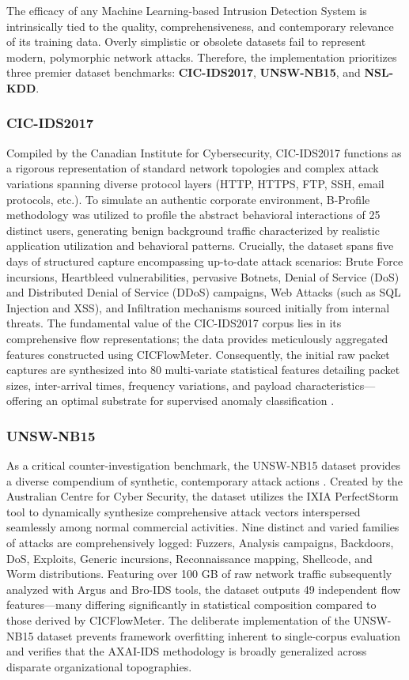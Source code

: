 \documentclass[conference]{IEEEtran}
\begin{document}
The efficacy of any Machine Learning-based Intrusion Detection System is intrinsically tied to the quality, comprehensiveness, and contemporary relevance of its training data. Overly simplistic or obsolete datasets fail to represent modern, polymorphic network attacks. Therefore, the implementation prioritizes three premier dataset benchmarks: \textbf{CIC-IDS2017}, \textbf{UNSW-NB15}, and \textbf{NSL-KDD}.

\subsubsection{CIC-IDS2017}
Compiled by the Canadian Institute for Cybersecurity, CIC-IDS2017 \cite{moustafa2015unsw} functions as a rigorous representation of standard network topologies and complex attack variations spanning diverse protocol layers (HTTP, HTTPS, FTP, SSH, email protocols, etc.). To simulate an authentic corporate environment, B-Profile methodology was utilized to profile the abstract behavioral interactions of 25 distinct users, generating benign background traffic characterized by realistic application utilization and behavioral patterns.
Crucially, the dataset spans five days of structured capture encompassing up-to-date attack scenarios: Brute Force incursions, Heartbleed vulnerabilities, pervasive Botnets, Denial of Service (DoS) and Distributed Denial of Service (DDoS) campaigns, Web Attacks (such as SQL Injection and XSS), and Infiltration mechanisms sourced initially from internal threats. The fundamental value of the CIC-IDS2017 corpus lies in its comprehensive flow representations; the data provides meticulously aggregated features constructed using CICFlowMeter. Consequently, the initial raw packet captures are synthesized into 80 multi-variate statistical features detailing packet sizes, inter-arrival times, frequency variations, and payload characteristics—offering an optimal substrate for supervised anomaly classification \cite{mahbooba2021explainable}.

\subsubsection{UNSW-NB15}
As a critical counter-investigation benchmark, the UNSW-NB15 dataset provides a diverse compendium of synthetic, contemporary attack actions \cite{alotaibi2023adaptive}. Created by the Australian Centre for Cyber Security, the dataset utilizes the IXIA PerfectStorm tool to dynamically synthesize comprehensive attack vectors interspersed seamlessly among normal commercial activities. Nine distinct and varied families of attacks are comprehensively logged: Fuzzers, Analysis campaigns, Backdoors, DoS, Exploits, Generic incursions, Reconnaissance mapping, Shellcode, and Worm distributions. Featuring over 100 GB of raw network traffic subsequently analyzed with Argus and Bro-IDS tools, the dataset outputs 49 independent flow features—many differing significantly in statistical composition compared to those derived by CICFlowMeter. The deliberate implementation of the UNSW-NB15 dataset prevents framework overfitting inherent to single-corpus evaluation and verifies that the AXAI-IDS methodology is broadly generalized across disparate organizational topographies.
\end{document}
